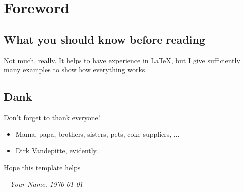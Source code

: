 \chapter{Foreword}

\section*{What you should know before reading}\vspace{-0.5em}
Not much, really. It helps to have experience in \LaTeX{}, but I give sufficiently many examples to show how everything works.

\section*{Dank}\vspace{-0.5em}
Don't forget to thank everyone!

\begin{itemize}
    \item Mama, papa, brothers, sisters, pets, coke suppliers, ...
    \item Dirk Vandepitte, evidently.
\end{itemize}

Hope this template helps!

\emph{-- Your Name, \today}